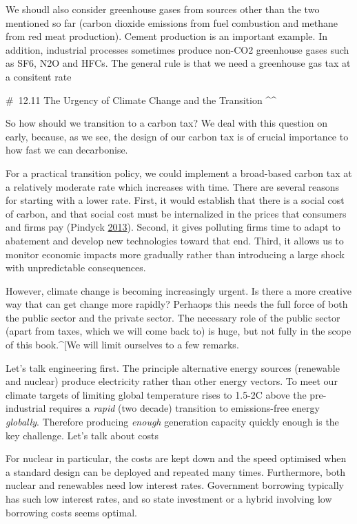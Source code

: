 \documentclass[]{tufte-handout}
\begin{document}
We shoudl also consider greenhouse gases from sources other than the two
mentioned so far (carbon dioxide emissions from fuel combustion and
methane from red meat production). Cement production is an important
example. In addition, industrial processes sometimes produce non-CO2
greenhouse gases such as SF6, N2O and HFCs. The general rule is that we
need a greenhouse gas tax at a consitent rate

\#~12.11 The Urgency of Climate Change and the Transition \^{}\^{}

So how should we transition to a carbon tax? We deal with this question
on early, because, as we see, the design of our carbon tax is of crucial
importance to how fast we can decarbonise.

For a practical transition policy, we could implement a broad-based
carbon tax at a relatively moderate rate which increases with time.
There are several reasons for starting with a lower rate. First, it
would establish that there is a social cost of carbon, and that social
cost must be internalized in the prices that consumers and firms pay
(Pindyck \protect\hyperlink{ref-Pindyck2013}{2013}). Second, it gives
polluting firms time to adapt to abatement and develop new technologies
toward that end. Third, it allows us to monitor economic impacts more
gradually rather than introducing a large shock with unpredictable
consequences.

However, climate change is becoming increasingly urgent. Is there a more
creative way that can get change more rapidly? Perhaops this needs the
full force of both the public sector and the private sector. The
necessary role of the public sector (apart from taxes, which we will
come back to) is huge, but not fully in the scope of this book.\^{}{[}We
will limit ourselves to a few remarks.

Let's talk engineering first. The principle alternative energy sources
(renewable and nuclear) produce electricity rather than other energy
vectors. To meet our climate targets of limiting global temperature
rises to 1.5-2C above the pre-industrial requires a \emph{rapid} (two
decade) transition to emissions-free energy \emph{globally}. Therefore
producing \emph{enough} generation capacity quickly enough is the key
challenge. Let's talk about costs

For nuclear in particular, the costs are kept down and the speed
optimised when a standard design can be deployed and repeated many
times. Furthermore, both nuclear and renewables need low interest rates.
Government borrowing typically has such low interest rates, and so state
investment or a hybrid involving low borrowing costs seems optimal.
\end{document}
